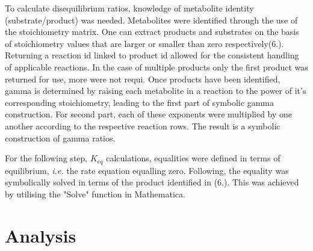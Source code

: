To calculate disequilibrium ratios, knowledge of metabolite identity (substrate/product) was needed. Metabolites were identified through the use of the stoichiometry matrix. One can extract products and substrates on the basis of stoichiometry values that are larger or smaller than zero respectively(6.). Returning a reaction id linked to product id allowed for the consistent handling of applicable reactions. In the case of multiple products only the first product was returned for use, more were not requi. Once products have been identified, gamma is determined by raising each metabolite in a reaction to the power of it's corresponding stoichiometry, leading to the first part of symbolic gamma construction. For second part, each of these exponents were multiplied by one another according to the respective reaction rows. The result is a symbolic construction of gamma ratios. 

For the following step, $K_{eq}$ calculations, equalities were defined in terms of equilibrium, \textit{i.e.} the rate equation equalling zero. Following, the equality was symbolically solved in terms of the product identified in (6.). This was achieved by utilising the "Solve" function in Mathematica.





\section{Analysis} \label{Analysis}
